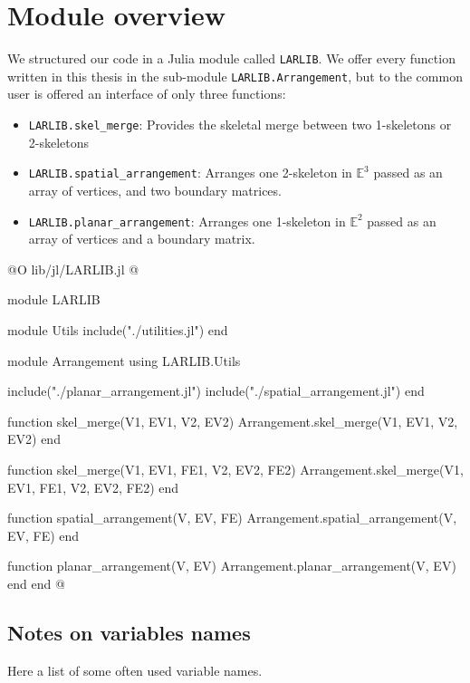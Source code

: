 \chapter{Module overview}

We structured our code in a Julia module called \texttt{LARLIB}.
We offer every function written in this thesis in the sub-module
\texttt{LARLIB.Arrangement}, but to the common user is offered
an interface of only three functions:
\begin{itemize}[noitemsep]
    \item \texttt{LARLIB.skel\_merge}: Provides the skeletal merge between two
        1-skeletons or 2-skeletons
    \item \texttt{LARLIB.spatial\_arrangement}: Arranges one 2-skeleton 
        in $\mathbb{E}^3$ passed as an array of vertices, and two boundary matrices.
    \item \texttt{LARLIB.planar\_arrangement}: Arranges one 1-skeleton 
        in $\mathbb{E}^2$ passed as an array of vertices and a boundary matrix.
\end{itemize}


@O lib/jl/LARLIB.jl
@{module LARLIB


    module Utils
        include("./utilities.jl")
    end

    module Arrangement
        using LARLIB.Utils

        include("./planar_arrangement.jl")
        include("./spatial_arrangement.jl")
    end

    function skel_merge(V1, EV1, V2, EV2)
        Arrangement.skel_merge(V1, EV1, V2, EV2)
    end

    function skel_merge(V1, EV1, FE1, V2, EV2, FE2)
        Arrangement.skel_merge(V1, EV1, FE1, V2, EV2, FE2)
    end

    function spatial_arrangement(V, EV, FE)
        Arrangement.spatial_arrangement(V, EV, FE)
    end

    function planar_arrangement(V, EV)
        Arrangement.planar_arrangement(V, EV)
    end
end
@}

\section{Notes on variables names}

Here a list of some often used variable names.

